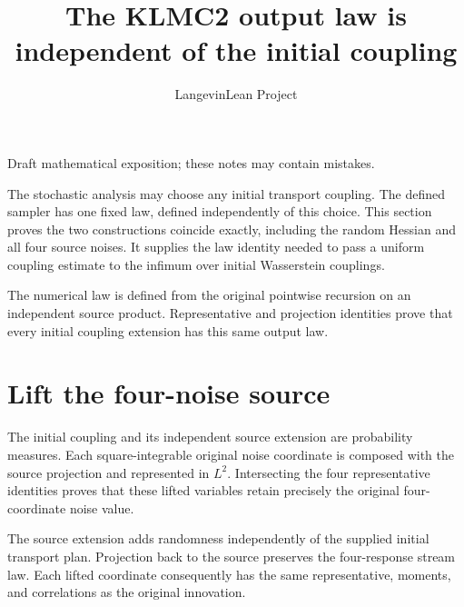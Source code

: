 \documentclass[11pt,a4paper]{article}
\title{\texorpdfstring{The KLMC2 output law is independent of the initial coupling}{The KLMC2 output law is independent of the initial coupling}}
\author{LangevinLean Project}
\date{}
\begin{document}
\maketitle
Draft mathematical exposition; these notes may contain mistakes.


The stochastic analysis may choose any initial transport coupling. The defined sampler has one fixed law, defined independently of this choice. This section proves the two constructions coincide exactly, including the random Hessian and all four source noises. It supplies the law identity needed to pass a uniform coupling estimate to the infimum over initial Wasserstein couplings.



The numerical law is defined from the original pointwise recursion on an independent source product. Representative and projection identities prove that every initial coupling extension has this same output law.


\section{\texorpdfstring{Lift the four-noise source}{Lift the four-noise source}}


The initial coupling and its independent source extension are probability measures. Each square-integrable original noise coordinate is composed with the source projection and represented in \(L^{2}\). Intersecting the four representative identities proves that these lifted variables retain precisely the original four-coordinate noise value.



The source extension adds randomness independently of the supplied initial transport plan. Projection back to the source preserves the four-response stream law. Each lifted coordinate consequently has the same representative, moments, and correlations as the original innovation.
\end{document}
